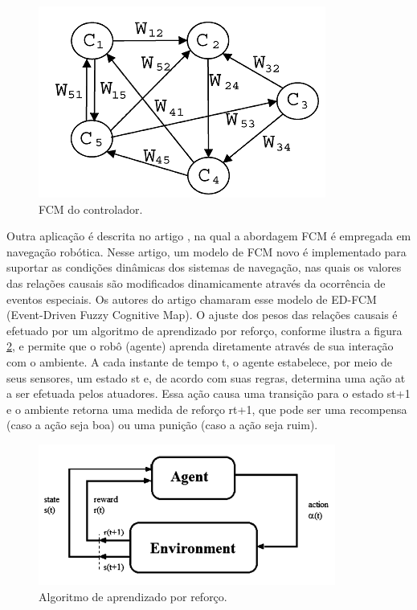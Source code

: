 \begin{figure}[!htb]
    \centering
    \includegraphics{./figs/fcm-exemplo-fcm.png}
    \caption[Mapa Cognitivo Fuzzy]{FCM do controlador.}
    \label{fig:fcm-exemplo-fcm}
\end{figure}

Outra aplicação é descrita no artigo \cite{MENDONCA}, na qual a abordagem FCM é empregada em navegação robótica. Nesse artigo, um modelo de FCM novo é implementado para suportar as condições dinâmicas dos sistemas de navegação, nas quais os valores das relações causais são modificados dinamicamente através da ocorrência de eventos especiais. Os autores do artigo chamaram esse modelo de ED-FCM (Event-Driven Fuzzy Cognitive Map). O ajuste dos pesos das relações causais é efetuado por um algoritmo de aprendizado por reforço, conforme ilustra a figura \ref{fig:reinforcement-alg}, e permite que o robô (agente) aprenda diretamente através de sua interação com o ambiente. A cada instante de tempo t, o agente estabelece, por meio de seus sensores, um estado st e, de acordo com suas regras, determina uma ação at a ser efetuada pelos atuadores. Essa ação causa uma transição para o estado st+1 e o ambiente retorna uma medida de reforço rt+1, que pode ser uma recompensa (caso a ação seja boa) ou uma punição (caso a ação seja ruim).

\begin{figure}[!htb]
    \centering
    \includegraphics{./figs/reinforcement.png}
    \caption[Mapa Cognitivo Fuzzy]{Algoritmo de aprendizado por reforço.}
    \label{fig:reinforcement-alg}
\end{figure}

